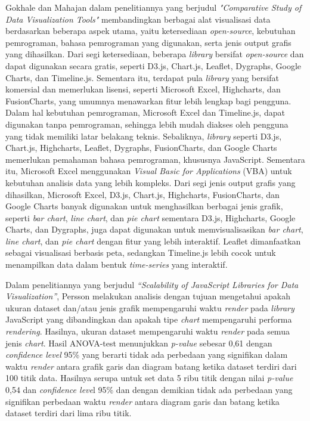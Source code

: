 Gokhale dan Mahajan \cite{Gokhale2020} dalam penelitiannya yang berjudul \textit{"Comparative Study of Data Visualization Tools"} membandingkan berbagai alat visualisasi data berdasarkan beberapa aspek utama, yaitu ketersediaan \textit{open-source}, kebutuhan pemrograman, bahasa pemrograman yang digunakan, serta jenis output grafis yang dihasilkan. Dari segi ketersediaan, beberapa \textit{library} bersifat \textit{open-source} dan dapat digunakan secara gratis, seperti D3.js, Chart.js, Leaflet, Dygraphs, Google Charts, dan Timeline.js. Sementara itu, terdapat pula \textit{library} yang bersifat komersial dan memerlukan lisensi, seperti Microsoft Excel, Highcharts, dan FusionCharts, yang umumnya menawarkan fitur lebih lengkap bagi pengguna. Dalam hal kebutuhan pemrograman, Microsoft Excel dan Timeline.js, dapat digunakan tanpa pemrograman, sehingga lebih mudah diakses oleh pengguna yang tidak memiliki latar belakang teknis. Sebaliknya, \textit{library} seperti D3.js, Chart.js, Highcharts, Leaflet, Dygraphs, FusionCharts, dan Google Charts memerlukan pemahaman bahasa pemrograman, khususnya JavaScript. Sementara itu, Microsoft Excel menggunakan \textit{Visual Basic for Applications} (VBA) untuk kebutuhan analisis data yang lebih kompleks. Dari segi jenis output grafis yang dihasilkan, Microsoft Excel, D3.js, Chart.js, Highcharts, FusionCharts, dan Google Charts banyak digunakan untuk menghasilkan berbagai jenis grafik, seperti \textit{bar chart}, \textit{line chart}, dan \textit{pie chart} sementara D3.js, Highcharts, Google Charts, dan Dygraphs, juga dapat digunakan untuk memvisualisasikan \textit{bar chart}, \textit{line chart}, dan \textit{pie chart} dengan fitur yang lebih interaktif. Leaflet dimanfaatkan sebagai visualisasi berbasis peta, sedangkan Timeline.js lebih cocok untuk menampilkan data dalam bentuk \textit{time-series} yang interaktif.

Dalam penelitiannya yang berjudul \textit{“Scalability of JavaScript Libraries for Data Visualization”}, Persson \cite{Persson2021} melakukan analisis dengan tujuan mengetahui apakah ukuran dataset dan/atau jenis grafik mempengaruhi waktu \textit{render} pada \textit{library} JavaScript yang dibandingkan dan apakah tipe \textit{chart} mempengaruhi performa \textit{rendering}. Hasilnya, ukuran dataset mempengaruhi waktu \textit{render} pada semua jenis \textit{chart}. Hasil ANOVA-test menunjukkan \textit{p-value} sebesar 0,61 dengan \textit{confidence level} 95\% yang berarti tidak ada perbedaan yang signifikan dalam waktu \textit{render} antara grafik garis dan diagram batang ketika dataset terdiri dari 100 titik data. Hasilnya serupa untuk set data 5 ribu titik dengan nilai \textit{p-value} 0,54 dan \textit{confidence leve}l 95\% dan dengan demikian tidak ada perbedaan yang signifikan perbedaan waktu \textit{render} antara diagram garis dan batang ketika dataset terdiri dari lima ribu titik.

